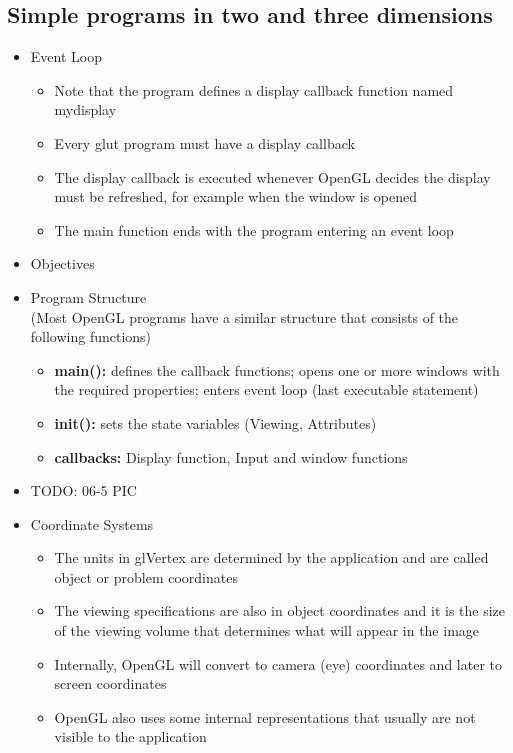 \documentclass[11pt,a4paper]{article}
\begin{document}
	\subsection{Simple programs in two and three dimensions}
		\begin{itemize}
			\item  Event Loop
			\begin{itemize}
				\item Note that the program defines a display callback function named mydisplay
				\item Every glut program must have a display callback
				\item The display callback is executed whenever OpenGL decides the display must be refreshed, for example when the window is opened
				\item The main function ends with the program entering an event loop
			\end{itemize}
			\item Objectives
			\item Program Structure \\
				(Most OpenGL programs have a similar structure that consists of	the following functions)
				\begin{itemize}
					\item \textbf{main():} defines the callback functions; opens one or more windows with the required properties; enters event loop (last executable statement)	
					\item \textbf{init():} sets the state variables	(Viewing, Attributes)
					\item \textbf{callbacks:} Display function, Input and window functions
				\end{itemize}
			\item TODO: 06-5 PIC
			\item Coordinate Systems
				\begin{itemize}
					\item The units in glVertex are determined by the application and are called object or problem coordinates	
					\item The viewing specifications are also in object	coordinates and it is the size of the viewing volume that determines what will appear in the image	
					\item Internally, OpenGL will convert to camera (eye) coordinates and later to screen coordinates 	
					\item OpenGL also uses some internal representations that usually are not visible to the application

\end{itemize}
\end{itemize}
\end{document}

